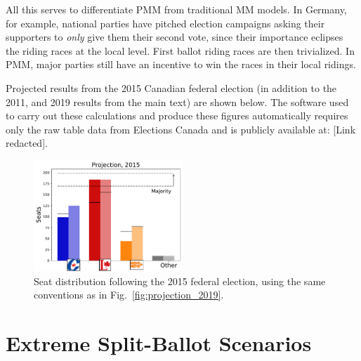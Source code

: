 All this serves to differentiate PMM from traditional MM models.
In Germany, for example, national parties have pitched election campaigns asking their supporters to \emph{only} give them their second vote, since their importance eclipses the riding races at the local level. First ballot riding races are then trivialized.
In PMM, major parties still have an incentive to win the races in their local ridings.


Projected results from the 2015 Canadian federal election (in addition to the 2011, and 2019 results from the main text) are shown below.
The software used to carry out these calculations and produce these figures automatically requires only the raw table data from Elections Canada and is publicly available at:
[Link redacted].

\begin{figure}[h!]
  \includegraphics[width=0.50\textwidth,clip]{PR_calcs/data/raw_2015/PMM_out/PMM_projections}
  \caption{ Seat distribution following the 2015 federal election, using the same conventions as in Fig.~\ref{fig:projection_2019}.}
\label{fig:projection_2015}
\end{figure}



\section{Extreme Split-Ballot Scenarios}


